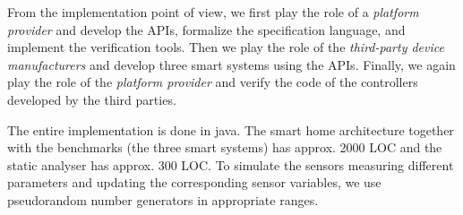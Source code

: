 \documentclass{article}
\begin{document}
From the implementation point of view, we first play the role of a \textit{platform provider} and develop the APIs, formalize the specification language, and implement the verification tools. Then we play the role of the \textit{third-party device manufacturers} and develop three smart systems using the APIs. Finally, we again play the role of the \textit{platform provider} and verify  the code of the controllers developed by the third parties.

The entire implementation is done in java. The smart home architecture together with the benchmarks (the three smart systems) has approx. 2000 LOC and the static analyser has approx. 300 LOC. To simulate the sensors measuring different parameters and updating the corresponding sensor variables, we use pseudorandom number generators in appropriate ranges. \\
\end{document}
